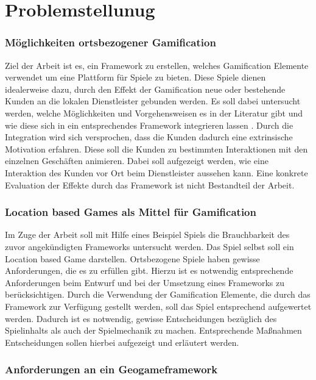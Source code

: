 \chapter{Problemstellunug}
\label{ch2:Problemstellunug}

\subsection*{Möglichkeiten ortsbezogener Gamification}

Ziel der Arbeit ist es, ein Framework zu erstellen, welches Gamification Elemente verwendet um eine Plattform für Spiele zu bieten. Diese Spiele dienen idealerweise dazu, durch den Effekt der Gamification neue oder bestehende Kunden an die lokalen Dienstleister gebunden werden. Es soll dabei untersucht werden, welche Möglichkeiten und Vorgehensweisen es in der Literatur gibt und wie diese sich in ein entsprechendes Framework integrieren lassen .
Durch die Integration wird sich versprochen, dass die Kunden dadurch eine extrinsische Motivation erfahren. Diese soll die Kunden zu bestimmten Interaktionen mit den einzelnen Geschäften animieren.
Dabei soll aufgezeigt werden, wie eine Interaktion des Kunden vor Ort beim Dienstleister aussehen kann. Eine konkrete Evaluation der Effekte durch das Framework ist nicht Bestandteil der Arbeit.

\subsection*{Location based Games als Mittel für Gamification}

Im Zuge der Arbeit soll mit Hilfe eines Beispiel Spiels die Brauchbarkeit des zuvor angekündigten Frameworks untersucht werden.
Das Spiel selbst soll ein Location based Game darstellen. Ortsbezogene Spiele haben gewisse Anforderungen, die es zu erfüllen gibt. Hierzu 
ist es notwendig entsprechende Anforderungen beim Entwurf und bei der Umsetzung eines Frameworks zu berücksichtigen.
Durch die Verwendung der Gamification Elemente, die durch das Framework zur Verfügung gestellt werden, soll das Spiel entsprechend aufgewertet werden. Dadurch ist es notwendig, gewisse Entscheidungen bezüglich des Spielinhalts als auch der Spielmechanik zu machen.
Entsprechende Maßnahmen Entscheidungen sollen hierbei aufgezeigt und erläutert werden.

\subsection*{Anforderungen an ein Geogameframework}

